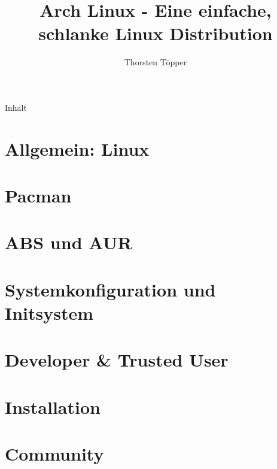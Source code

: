\documentclass[mode=print,paper=screen,size=11pt,style=horatio]{powerdot}
\author{Thorsten T\"{o}pper}
\title{Arch Linux - Eine einfache, schlanke Linux Distribution}
\begin{document}
\maketitle
\begin{slide}{Inhalt}
  \tableofcontents[content=sections]
\end{slide}

\section{Allgemein: Linux}



\section{Pacman}


\section{ABS und AUR}


\section{Systemkonfiguration und Initsystem}


\section{Developer \& Trusted User}


\section{Installation}


\section{Community}

\end{document}
